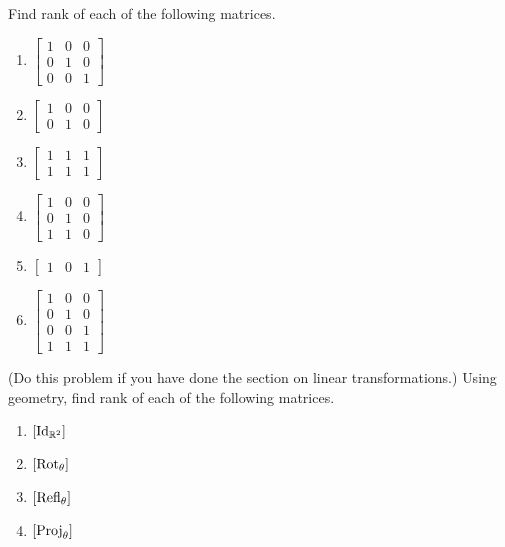 \begin{qbox}
  \label{q:rankComputation1}
  Find rank of each of the following matrices.
  \begin{multicols}{2}
    \begin{enumerate}
      \item $ \begin{bmatrix} 1 & 0 & 0 \\ 0 & 1 & 0 \\ 0 & 0 & 1 \end{bmatrix}$
      \item $ \begin{bmatrix} 1 & 0 & 0 \\ 0 & 1 & 0 \end{bmatrix}$
      \item $ \begin{bmatrix} 1 & 1 & 1 \\ 1 & 1 & 1 \end{bmatrix}$
      \item $ \begin{bmatrix} 1 & 0 & 0 \\ 0 & 1 & 0 \\ 1 & 1 & 0\end{bmatrix}$
      \item $\begin{bmatrix} 1 & 0 & 1 \end{bmatrix}$
      \item $ \begin{bmatrix} 1 & 0 & 0 \\ 0 & 1 & 0 \\ 0 & 0 & 1 \\ 1 & 1 & 1\end{bmatrix}$
    \end{enumerate}
  \end{multicols}
\end{qbox}

\begin{qbox}(Do this problem if you have done the section on linear transformations.)
  \label{q:rankComputation2}
  Using geometry, find rank of each of the following matrices.
  \begin{multicols}{2}
    \begin{enumerate}
      \item $[\operatorname{Id}_{\mathbb{R}^2}]$
      \item $[\mathrm{Rot}_{\theta}]$
      \item $[\mathrm{Refl}_{\theta}]$
      \item $[\mathrm{Proj}_{\theta}]$
    \end{enumerate}
  \end{multicols}
\end{qbox}











